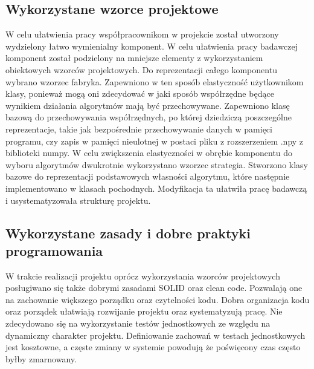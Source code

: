 \documentclass[oneside, eng]{mgr}
\begin{document}
\subsection{Wykorzystane wzorce projektowe}

W celu ułatwienia pracy współpracownikom w projekcie został utworzony wydzielony łatwo wymienialny komponent. W celu ułatwienia pracy badawczej komponent został podzielony na mniejsze elementy z wykorzystaniem obiektowych wzorców projektowych.
Do reprezentacji całego komponentu wybrano wzorzec fabryka. Zapewniono w ten sposób elastyczność użytkownikom klasy, ponieważ mogą oni zdecydować w jaki sposób współrzędne będące wynikiem działania algorytmów mają być przechowywane. Zapewniono klasę bazową do przechowywania współrzędnych, po której dziedziczą poszczególne reprezentacje, takie jak bezpośrednie przechowywanie danych w pamięci programu, czy zapis w pamięci nieulotnej w postaci pliku z rozszerzeniem .npy z biblioteki numpy.
W celu zwiększenia elastyczności w obrębie komponentu do wyboru algorytmów dwukrotnie wykorzystano wzorzec strategia. Stworzono klasy bazowe do reprezentacji podstawowych własności algorytmu, które następnie implementowano w klasach pochodnych. Modyfikacja ta ułatwiła pracę badawczą i usystematyzowała strukturę projektu.

\subsection{Wykorzystane zasady i dobre praktyki programowania}

W trakcie realizacji projektu oprócz wykorzystania wzorców projektowych posługiwano się także dobrymi zasadami SOLID oraz clean code. Pozwalają one na zachowanie większego porządku oraz czytelności kodu. Dobra organizacja kodu oraz porządek ułatwiają rozwijanie projektu oraz systematyzują pracę. Nie zdecydowano się na wykorzystanie testów jednostkowych ze względu na dynamiczny charakter projektu. Definiowanie zachowań w testach jednostkowych jest kosztowne, a częste zmiany w systemie powodują że poświęcony czas często byłby zmarnowany.
\end{document}
